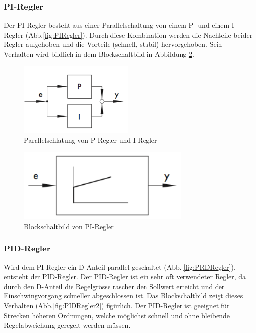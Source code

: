 \subsubsection{PI-Regler}
Der PI-Regler besteht aus einer Parallelschaltung von einem P- und einem I-Regler (Abb.\ref{fig:PIRegler}). Durch diese Kombination werden die Nachteile beider Regler aufgehoben und die Vorteile (schnell, stabil) hervorgehoben. Sein Verhalten wird bildlich in dem Blockschaltbild in Abbildung \ref{fig:PIRegler2}.\\

\begin{figure}[h!, width=\pagewidth]
\begin{center}
\includegraphics[width=0.5\textwidth]{images/PIRegler1}
\caption{Parallelschlatung von P-Regler und I-Regler}
\label{fig:PIRegler1}
\end{center}
\end{figure}

\begin{figure}[h!, width=\pagewidth]
\begin{center}
\includegraphics[width=0.75\textwidth]{images/PIRegler2}
\caption{Blockschaltbild von PI-Regler}
\label{fig:PIRegler2}
\end{center}
\end{figure}


\subsubsection{PID-Regler}
Wird dem PI-Regler ein D-Anteil parallel geschaltet (Abb. \ref{fig:PRDRegler}), entsteht der PID-Regler. Der PID-Regler ist ein sehr oft verwendeter Regler, da durch den D-Anteil die Regelgrösse rascher den Sollwert erreicht und der Einschwingvorgang schneller abgeschlossen ist. Das Blockschaltbild zeigt dieses Verhalten (Abb.\ref{fig:PIDRegler2}) figürlich. Der PID-Regler ist geeignet für Strecken höheren Ordnungen, welche möglichst schnell und ohne bleibende Regelabweichung geregelt werden müssen.

